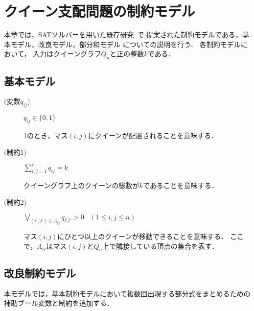 \chapter{クイーン支配問題の制約モデル}\label{chap:constraint}
本章では，SATソルバーを用いた既存研究~\cite{yamamoto21}で
提案された制約モデルである，基本モデル，改良モデル，部分和モデル
についての説明を行う．
各制約モデルにおいて，
入力はクイーングラフ$Q_{n}$と正の整数$k$である．

\section{基本モデル}
\begin{description}
 \item[(変数$q_{ij}$)] $q_{ij} \in \{0,1\}$ \par
1のとき，マス$(i,j)$にクイーンが配置されることを意味する．
 \item[(制約1)] $\sum\limits_{i,j=1}^{n} q_{ij} = k$ \par
クイーングラフ上のクイーンの総数が$k$であることを意味する．
 \item[(制約2)] $\bigvee\limits_{(i',j')\in A_{ij}} q_{i'j'}>0 \;\;\;(1 \leq i,j \leq n)$ \par
マス$(i,j)$にひとつ以上のクイーンが移動できることを意味する．
ここで，$A_{ij}$はマス$(i,j)$と$Q_n$上で隣接している頂点の集合を表す．
\end{description}

\section{改良制約モデル}
本モデルでは，基本制約モデルにおいて複数回出現する部分式をまとめるための
補助ブール変数と制約を追加する．

